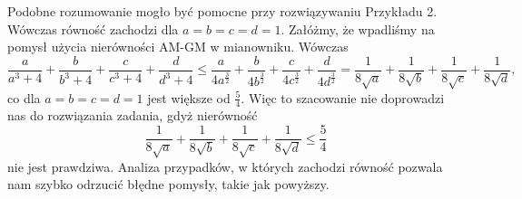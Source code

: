 \noindent 
Podobne rozumowanie mogło być pomocne przy rozwiązywaniu Przykładu 2. Wówczas równość zachodzi dla $a = b = c = d = 1$. Załóżmy, że wpadliśmy na pomysł użycia nierówności AM-GM w mianowniku. Wówczas
\[
    \frac{a}{a^3 + 4} + \frac{b}{b^3 + 4} + \frac{c}{c^3 + 4} + \frac{d}{d^3 + 4} \leqslant \frac{a}{4a^{\frac{3}{2}}} + \frac{b}{4b^{\frac{3}{2}}} + \frac{c}{4c^{\frac{3}{2}}} + \frac{d}{4d^{\frac{3}{2}}} = \frac{1}{8\sqrt{a}} +  \frac{1}{8\sqrt{b}} +  \frac{1}{8\sqrt{c}} +  \frac{1}{8\sqrt{d}},
\]
co dla $a = b = c = d = 1$ jest większe od $\frac{5}{4}$. Więc to szacowanie nie doprowadzi nas do rozwiązania zadania, gdyż nierówność
\[
    \frac{1}{8\sqrt{a}} +  \frac{1}{8\sqrt{b}} +  \frac{1}{8\sqrt{c}} +  \frac{1}{8\sqrt{d}} \leqslant \frac{5}{4}
\]
nie jest prawdziwa. Analiza przypadków, w których zachodzi równość pozwala nam szybko odrzucić błędne pomysły, takie jak powyższy.

\vspace{10px}